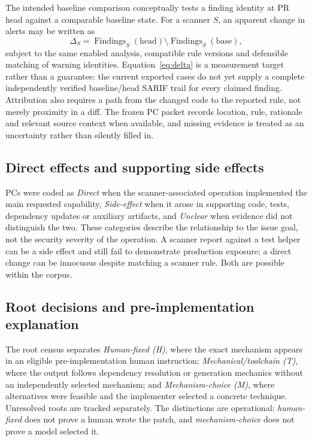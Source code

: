 \documentclass[journal,10pt,twoside]{IEEEtran}
\begin{document}
The intended baseline comparison conceptually tests a finding identity at PR head against a comparable baseline state. For a scanner $S$, an apparent change in alerts may be written as
\begin{equation}
 \Delta_S = \operatorname{Findings}_S(\text{head}) \setminus \operatorname{Findings}_S(\text{base}),
 \label{eq:delta}
\end{equation}
subject to the same enabled analysis, compatible rule versions and defensible matching of warning identities. Equation~\eqref{eq:delta} is a measurement target rather than a guarantee: the current exported cases do not yet supply a complete independently verified baseline/head SARIF trail for every claimed finding. Attribution also requires a path from the changed code to the reported rule, not merely proximity in a diff. The frozen PC packet records location, rule, rationale and relevant source context when available, and missing evidence is treated as an uncertainty rather than silently filled in.

\subsection{Direct effects and supporting side effects}
PCs were coded as \emph{Direct} when the scanner-associated operation implemented the main requested capability, \emph{Side-effect} when it arose in supporting code, tests, dependency updates or auxiliary artifacts, and \emph{Unclear} when evidence did not distinguish the two. These categories describe the relationship to the issue goal, not the security severity of the operation. A scanner report against a test helper can be a side effect and still fail to demonstrate production exposure; a direct change can be innocuous despite matching a scanner rule. Both are possible within the corpus.

\subsection{Root decisions and pre-implementation explanation}
The root census separates \emph{Human-fixed (H)}, where the exact mechanism appears in an eligible pre-implementation human instruction; \emph{Mechanical/toolchain (T)}, where the output follows dependency resolution or generation mechanics without an independently selected mechanism; and \emph{Mechanism-choice (M)}, where alternatives were feasible and the implementer selected a concrete technique. Unresolved roots are tracked separately. The distinctions are operational: \emph{human-fixed} does not prove a human wrote the patch, and \emph{mechanism-choice} does not prove a model selected it.
\end{document}

